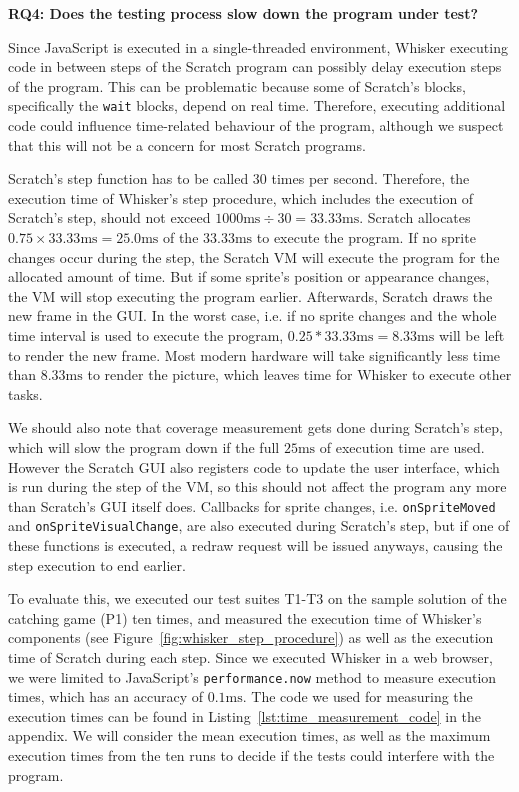 \begin{center}\begin{minipage}{.9\textwidth}
    \textbf{RQ4: Does the testing process slow down the program under test?}
\end{minipage}\end{center}

\noindent Since JavaScript is executed in a single-threaded environment,
Whisker executing code in between steps of the Scratch program can possibly delay execution steps of the program.
This can be problematic because some of Scratch's blocks,
specifically the \texttt{wait} blocks, depend on real time.
Therefore, executing additional code could influence time-related behaviour of the program,
although we suspect that this will not be a concern for most Scratch programs.
\parspace

Scratch's step function has to be called 30 times per second.
Therefore, the execution time of Whisker's step procedure, which includes the execution of Scratch's step,
should not exceed $1000\text{ms} \div 30 = 33.33\text{ms}$.
Scratch allocates $0.75 \times 33.33\text{ms} = 25.0\text{ms}$ of the $33.33\text{ms}$ to execute the program.
If no sprite changes occur during the step,
the Scratch VM will execute the program for the allocated amount of time.
But if some sprite's position or appearance changes, the VM will stop executing the program earlier.
Afterwards, Scratch draws the new frame in the GUI.
In the worst case, i.e. if no sprite changes and the whole time interval is used to execute the program,
$0.25 * 33.33\text{ms} = 8.33\text{ms}$ will be left to render the new frame.
Most modern hardware will take significantly less time than $8.33\text{ms}$ to render the picture,
which leaves time for Whisker to execute other tasks.
\parspace

We should also note that coverage measurement gets done during Scratch's step,
which will slow the program down if the full $25\text{ms}$ of execution time are used.
However the Scratch GUI also registers code to update the user interface, which is run during the step of the VM,
so this should not affect the program any more than Scratch's GUI itself does.
Callbacks for sprite changes, i.e. \texttt{onSpriteMoved} and \texttt{onSpriteVisualChange},
are also executed during Scratch's step, but if one of these functions is executed, a redraw request will be issued anyways,
causing the step execution to end earlier.
\parspace

To evaluate this,
we executed our test suites T1-T3 on the sample solution of the catching game (P1) ten times,
and measured the execution time of Whisker's components (see Figure~\ref{fig:whisker_step_procedure})
as well as the execution time of Scratch during each step.
Since we executed Whisker in a web browser,
we were limited to JavaScript's \texttt{performance.now} method to measure execution times,
which has an accuracy of $0.1\text{ms}$.
The code we used for measuring the execution times can be found in Listing~\ref{lst:time_measurement_code} in the appendix.
We will consider the mean execution times, as well as the maximum execution times from the ten runs
to decide if the tests could interfere with the program.


